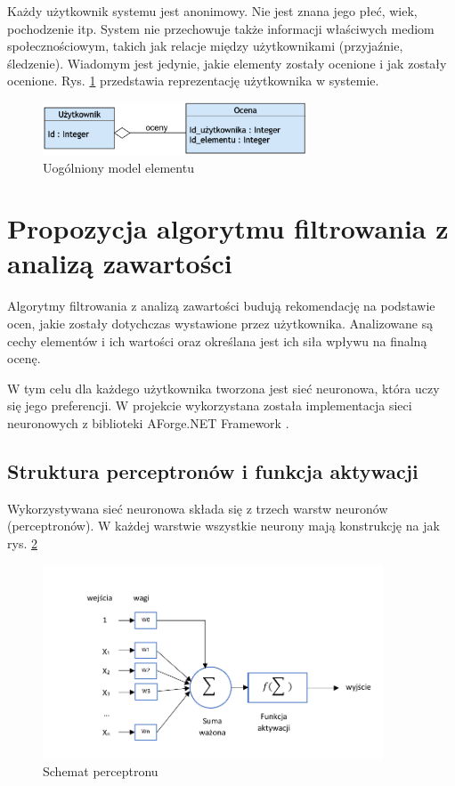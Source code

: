 \documentclass[twoside]{iisthesis}
\begin{document}
	Każdy użytkownik systemu jest anonimowy. Nie jest znana jego płeć, wiek, pochodzenie itp. System nie przechowuje także informacji właściwych mediom społecznościowym, takich jak relacje między użytkownikami (przyjaźnie, śledzenie). Wiadomym jest jedynie, jakie elementy zostały ocenione i jak zostały ocenione. Rys. \ref{fig:modelUsera} przedstawia reprezentację użytkownika w systemie.
	
	\begin{figure}[!ht] 
		\centering
		\includegraphics[width=0.7\textwidth]{modelUsera}
		\caption{Uogólniony model elementu}
		\label{fig:modelUsera}
	\end{figure}
		 
 	\section{Propozycja algorytmu filtrowania z analizą zawartości}
	 
	Algorytmy filtrowania z analizą zawartości budują rekomendację na podstawie ocen, jakie zostały dotychczas wystawione przez użytkownika. Analizowane są cechy elementów i ich wartości oraz określana jest ich siła wpływu na finalną ocenę. 
	
	W tym celu dla każdego użytkownika tworzona jest sieć neuronowa, która uczy się jego preferencji. W projekcie wykorzystana została implementacja sieci neuronowych z biblioteki AForge.NET Framework \cite{aforgenet}.
	 
	 \subsection{Struktura perceptronów i funkcja aktywacji}
	 \label{sss:strukturaperceptronow}
	 
	 Wykorzystywana sieć neuronowa składa się z trzech warstw neuronów (perceptronów). W każdej warstwie wszystkie neurony mają konstrukcję na jak rys. \ref{fig:schematneuronu}
	 
	 \begin{figure}[!ht] 		 		 	
	 	\includegraphics[width=0.9\textwidth]{schematneuron}
	 	\caption{Schemat perceptronu}
	 	\label{fig:schematneuronu}
	 \end{figure}
	 
\end{document}
